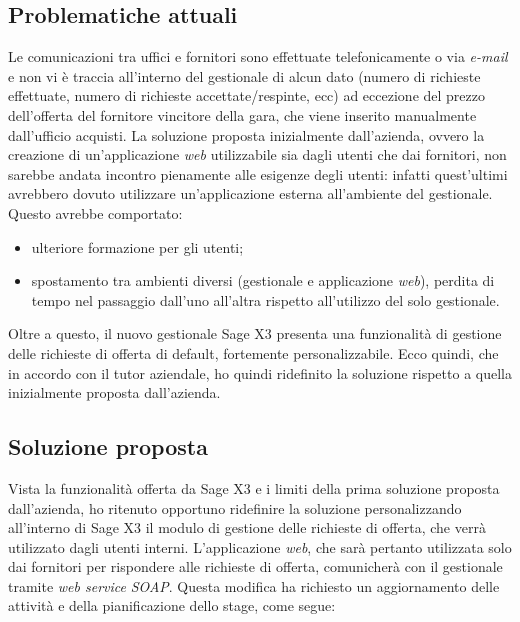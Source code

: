 \subsection{Problematiche attuali}
Le comunicazioni tra uffici e fornitori sono effettuate telefonicamente o via \textit{e-mail} e non vi è traccia all'interno del gestionale di alcun dato (numero di richieste effettuate, numero di richieste accettate/respinte, ecc) ad eccezione del prezzo dell'offerta del fornitore vincitore della gara, che viene inserito manualmente dall'ufficio acquisti.
La soluzione proposta inizialmente dall'azienda, ovvero la creazione di un'applicazione \textit{web} utilizzabile sia dagli utenti che dai fornitori, non sarebbe andata incontro pienamente alle esigenze degli utenti: infatti quest'ultimi avrebbero dovuto utilizzare un'applicazione esterna all'ambiente del gestionale. 
Questo avrebbe comportato:
\begin{itemize}
	\item ulteriore formazione per gli utenti;
	\item spostamento tra ambienti diversi (gestionale e applicazione \textit{web}), perdita di tempo nel passaggio dall'uno all'altra rispetto all'utilizzo del solo gestionale.
\end{itemize}
Oltre a questo, il nuovo gestionale Sage X3 presenta una funzionalità di gestione delle richieste di offerta di default, fortemente personalizzabile.
Ecco quindi, che in accordo con il tutor aziendale, ho quindi ridefinito la soluzione rispetto a quella inizialmente proposta dall'azienda.

\subsection{Soluzione proposta}
Vista la funzionalità offerta da Sage X3 e i limiti della prima soluzione proposta dall'azienda, ho ritenuto opportuno ridefinire la soluzione personalizzando all'interno di Sage X3 il modulo di gestione delle richieste di offerta, che verrà utilizzato dagli utenti interni.
L'applicazione \textit{web}, che sarà pertanto utilizzata solo dai fornitori per rispondere alle richieste di offerta, comunicherà con il gestionale tramite \textit{web service} \textit{SOAP}.
Questa modifica ha richiesto un aggiornamento delle attività e della pianificazione dello stage, come segue:

